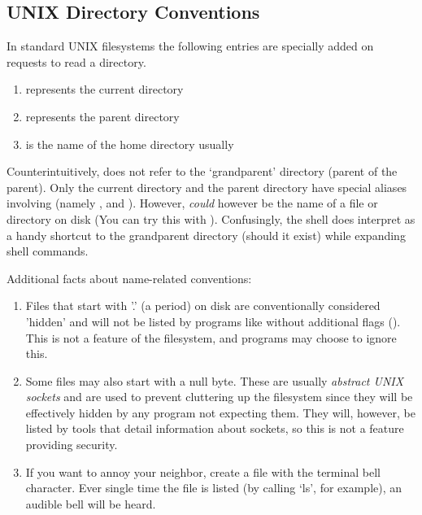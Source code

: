 \subsection{UNIX Directory Conventions}

In standard UNIX filesystems the following entries are specially added on requests to read a directory.

\begin{enumerate}
  \item {} represents the current directory
  \item {} represents the parent directory
  \item \keyword{~~} is the name of the home directory usually
\end{enumerate}

Counterintuitively,  does not refer to the `grandparent' directory (parent of the parent).
Only the current directory and the parent directory have special aliases involving  (namely ,  and ).
However,  \emph{could} however be the name of a file or directory on disk (You can try this with ).
Confusingly, the shell  does interpret  as a handy shortcut to the grandparent directory (should it exist) while expanding shell commands.

Additional facts about name-related conventions:

\begin{enumerate}
    \item Files that start with '.' (a period) on disk are conventionally considered 'hidden' and will not be listed by programs like  without additional flags ().
        This is not a feature of the filesystem, and programs may choose to ignore this.
    \item Some files may also start with a null byte.
            These are usually \emph{abstract UNIX sockets} and are used to prevent cluttering up the filesystem since they will be effectively hidden by any program not expecting them.
            They will, however, be listed by tools that detail information about sockets, so this is not a feature providing security.
    \item If you want to annoy your neighbor, create a file with the terminal bell character.
        Ever single time the file is listed (by calling `ls', for example), an audible bell will be heard.
\end{enumerate}

